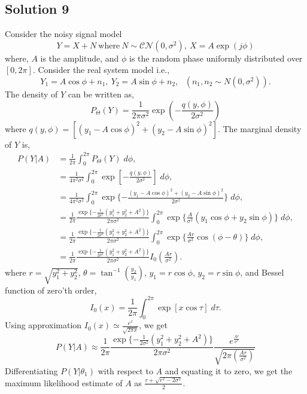\documentclass[a4paper,english,12pt]{article}
\begin{document}
\hypertarget{solution9}{\subsection*{Solution 9}}
Consider the noisy signal model
\begin{equation}
Y = X + N~\mbox{where}~N\sim \mathcal{CN}(0,\sigma^{2}),~X = A\exp(j\phi)
\end{equation}
where, $A$ is the amplitude, and $\phi$ is the random phase uniformly distributed over  $[0,2\pi]$. Consider the real system model i.e.,
\begin{equation*}
Y_{1} = A\cos\phi + n_{1},~Y_{2} = A\sin\phi + n_{2},~~~(n_{1},n_{2} \sim N(0,\sigma^{2})).
\end{equation*}
The density of $Y$ can be written as,
\begin{equation*}
P_{\Theta}(Y) = \frac{1}{2\pi \sigma^{2}} \exp(-\frac{q(y,\phi)}{2\sigma^{2}})
\end{equation*} 
where $q(y,\phi) = [(y_{1} - A\cos\phi)^{2} + (y_{2} - A\sin\phi)^{2}]$. The marginal density of $Y$ is,
\begin{align*}
P(Y|A) &= \frac{1}{2\pi} \int_{0}^{2\pi} P_{\Theta}(Y) \;d\phi,\\
&=\frac{1}{4\pi^{2} \sigma^{2}} \int_{0}^{2\pi} \exp\left[-\frac{q(y,\phi)}{2\sigma^{2}}\right] \;d\phi,\\
&=\frac{1}{4\pi^{2} \sigma^{2}} \int_{0}^{2\pi} \exp\{-\frac{(y_{1} - A\cos\phi)^{2} + (y_{2} - A\sin\phi)^{2}}{2\sigma^{2}}\} \;d\phi,\\
&= \frac{1}{2\pi} \frac{\exp\{-\frac{1}{2\sigma^{2}}(y_{1}^{2} + y_{2}^{2} + A^{2})\}}{2\pi \sigma^{2}} \int_{0}^{2\pi} \exp\{\frac{A}{\sigma^{2}}(y_{1}\cos\phi + y_{2}\sin \phi)\} \;d\phi,\\
&= \frac{1}{2\pi} \frac{\exp\{-\frac{1}{2\sigma^{2}}(y_{1}^{2} + y_{2}^{2} + A^{2})\}}{2\pi \sigma^{2}}  \int_{0}^{2\pi}\exp \{\frac{Ar}{\sigma^{2}}\cos(\phi - \theta)\} \;d\phi,\\
&= \frac{1}{2\pi} \frac{\exp\{-\frac{1}{2\sigma^{2}}(y_{1}^{2} + y_{2}^{2} + A^{2})\}}{2\pi \sigma^{2}} I_0(\frac{Ar}{\sigma^{2}}).
\end{align*}
where $r = \sqrt{y_{1}^{2} + y_{2}^{2}}$, $\theta  = \tan^{-1}(\frac{y_{2}}{y_{1}})$, $y_{1} = r\cos \phi$, $y_{2} = r\sin\phi$, and Bessel function of zero'th order,
\begin{equation*}
I_{0}(x) = \frac{1}{2\pi} \int_{0}^{2\pi} \exp[x\cos \tau] \;d\tau.
\end{equation*}
Using approximation $I_{0}(x) \simeq \frac{e^{x}}{\sqrt{2\pi x}}$, we get
\begin{equation*}
P(Y|A) \approx \frac{1}{2\pi} \frac{\exp\{-\frac{1}{2\sigma^{2}}(y_{1}^{2} + y_{2}^{2} + A^{2})\}}{2\pi \sigma^{2}}  \frac{e^{\frac{Ar}{\sigma^{2}}}}{\sqrt{2\pi(\frac{Ar}{\sigma^{2}})}}
\end{equation*}
Differentiating $P(Y|\theta_{1})$ with respect to $A$ and equating it to zero, we get the maximum likelihood estimate of $A$ as $\frac{r+\sqrt{r^{2} - 2\sigma^{2}}}{2}$.
\end{document}
